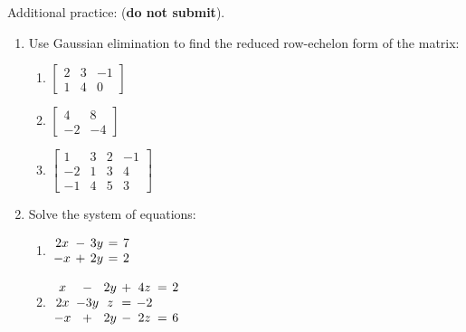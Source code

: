 \documentclass[12pt]{article}
\newcommand{\bbm}{\begin{bmatrix}}
\newcommand{\ebm}{\end{bmatrix}}
\begin{document}
Additional practice: (\textbf{do not submit}).
\begin{enumerate}
\item Use Gaussian elimination to find the reduced row-echelon form of the matrix:
\begin{multicols}{3}
\begin{enumerate}
\item $\bbm 2&3&-1\\1&4&0\ebm$
\item $\bbm 4&8\\-2&-4\ebm$
\item $\bbm 1&3&2&-1\\-2&1&3&4\\-1&4&5&3\ebm$
\end{enumerate}
\end{multicols}
\item Solve the system of equations:
\begin{multicols}{2}
\begin{enumerate}
\item $\arraycolsep2pt\begin{array}{ccccc}
2x&-&3y&=&7\\-x&+&2y&=&2\end{array}$
\item $\arraycolsep2pt\begin{array}{ccccccc}
x&-&2y&+&4z&=&2\\2x&-3y&z&=&-2\\-x&+&2y&-&2z&=&6\end{array}$
\end{enumerate}
\end{multicols}
\end{enumerate}


\newpage
\end{document}
